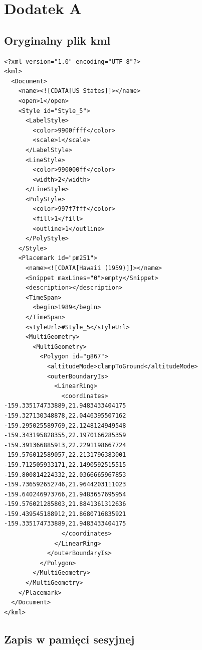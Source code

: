 ﻿\chapter{Dodatek A}
\label{cha:appa}

\section{Oryginalny plik kml}
\label{sec:akml}

\lstset{language=XML}
\begin{lstlisting}[caption=Plik KML]
<?xml version="1.0" encoding="UTF-8"?>
<kml>
  <Document>
    <name><![CDATA[US States]]></name>
    <open>1</open>
    <Style id="Style_5">
      <LabelStyle>
        <color>9900ffff</color>
        <scale>1</scale>
      </LabelStyle>
      <LineStyle>
        <color>990000ff</color>
        <width>2</width>
      </LineStyle>
      <PolyStyle>
        <color>997f7fff</color>
        <fill>1</fill>
        <outline>1</outline>
      </PolyStyle>
    </Style>
    <Placemark id="pm251">
      <name><![CDATA[Hawaii (1959)]]></name>
      <Snippet maxLines="0">empty</Snippet>
      <description></description>
      <TimeSpan>
        <begin>1989</begin>
      </TimeSpan>
      <styleUrl>#Style_5</styleUrl>
      <MultiGeometry>
        <MultiGeometry>
          <Polygon id="g867">
            <altitudeMode>clampToGround</altitudeMode>
            <outerBoundaryIs>
              <LinearRing>
                <coordinates>
-159.335174733889,21.9483433404175
-159.327130348878,22.0446395507162
-159.295025589769,22.1248124949548
-159.343195828355,22.1970166285359
-159.391366885913,22.2291198667724
-159.576012589057,22.2131796383001
-159.712505933171,22.1490592515515
-159.800814224332,22.0366665967853
-159.736592652746,21.9644203111023
-159.640246973766,21.9483657695954
-159.576021285803,21.8841361312636
-159.439545188912,21.8680716835921
-159.335174733889,21.9483433404175
                </coordinates>
              </LinearRing>
            </outerBoundaryIs>
          </Polygon>
        </MultiGeometry>
      </MultiGeometry>
    </Placemark>
  </Document>
</kml>

\end{lstlisting}

\section{Zapis w pamięci sesyjnej}
\label{sec:ass}

